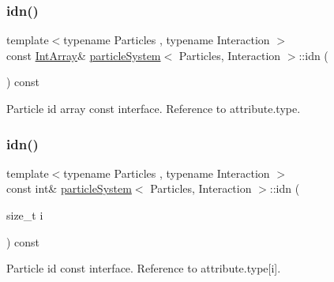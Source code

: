 \mbox{\label{classparticle_system_a551d6833ec7b1f42a0d2c6b8ad0b3ddb}} 
\subsubsection{\texorpdfstring{idn()}{idn()}\hspace{0.1cm}{\footnotesize\ttfamily [1/2]}}
{\footnotesize\ttfamily template$<$typename Particles , typename Interaction $>$ \\
const \mbox{\hyperlink{classparticle_system_aea9c70dc1a9d1947b425f5383fb21e24}{Int\+Array}}\& \mbox{\hyperlink{classparticle_system}{particle\+System}}$<$ Particles, Interaction $>$\+::idn (\begin{DoxyParamCaption}{ }\end{DoxyParamCaption}) const\hspace{0.3cm}{\ttfamily [inline]}}



Particle id array const interface. Reference to attribute.\+type. 

\mbox{\label{classparticle_system_a1d809808c2eaeeaa2e58b8fcf0aa5789}} 
\subsubsection{\texorpdfstring{idn()}{idn()}\hspace{0.1cm}{\footnotesize\ttfamily [2/2]}}
{\footnotesize\ttfamily template$<$typename Particles , typename Interaction $>$ \\
const int\& \mbox{\hyperlink{classparticle_system}{particle\+System}}$<$ Particles, Interaction $>$\+::idn (\begin{DoxyParamCaption}\item[{size\+\_\+t}]{i }\end{DoxyParamCaption}) const\hspace{0.3cm}{\ttfamily [inline]}}



Particle id const interface. Reference to attribute.\+type\mbox{[}i\mbox{]}. 

\mbox{\label{classparticle_system_abda10b9f9dc5ea55a2d9fdf7f9d76d8d}} 
